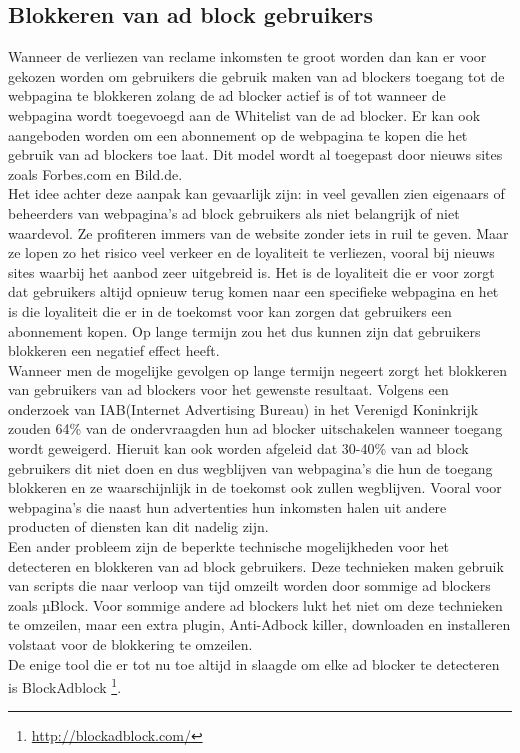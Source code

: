 \documentclass[pdftex,a4paper,12pt,twoside]{report}
\begin{document}
\subsection{Blokkeren van ad block gebruikers}
\label{sec Blokkeren van ad block gebruikers}
Wanneer de verliezen van reclame inkomsten te groot worden dan kan er voor gekozen worden om gebruikers die gebruik maken van ad blockers toegang tot de webpagina te blokkeren zolang de ad blocker actief is of tot wanneer de webpagina wordt toegevoegd aan de \gls{Whitelist} van de ad blocker. Er kan ook aangeboden worden om een abonnement op de webpagina te kopen die het gebruik van ad blockers toe laat. Dit model wordt al toegepast door nieuws sites zoals Forbes.com en Bild.de.
\\
Het idee achter deze aanpak kan gevaarlijk zijn: in veel gevallen zien eigenaars of beheerders van webpagina's ad block gebruikers als niet belangrijk of niet waardevol. Ze profiteren immers van de website zonder iets in ruil te geven. Maar ze lopen zo het risico veel verkeer en de loyaliteit te verliezen, vooral bij nieuws sites waarbij het aanbod zeer uitgebreid is. Het is de loyaliteit die er voor zorgt dat gebruikers altijd opnieuw terug komen naar een specifieke webpagina en het is die loyaliteit die er in de toekomst voor kan zorgen dat gebruikers een abonnement kopen. Op lange termijn zou het dus kunnen zijn dat gebruikers blokkeren een negatief effect heeft.
\\
Wanneer men de mogelijke gevolgen op lange termijn negeert zorgt het blokkeren van gebruikers van ad blockers voor het gewenste resultaat. Volgens een onderzoek van IAB(Internet Advertising Bureau) in het Verenigd Koninkrijk zouden 64\% van de ondervraagden hun ad blocker uitschakelen wanneer toegang wordt geweigerd. Hieruit kan ook worden afgeleid dat 30-40\% van ad block gebruikers dit niet doen en dus wegblijven van webpagina's die hun de toegang blokkeren en ze waarschijnlijk in de toekomst ook zullen wegblijven. Vooral voor webpagina's die naast hun advertenties hun inkomsten halen uit andere producten of diensten kan dit nadelig zijn.
\\
Een ander probleem zijn de beperkte technische mogelijkheden voor het detecteren en blokkeren van ad block gebruikers. Deze technieken maken gebruik van scripts die naar verloop van tijd omzeilt worden door sommige ad blockers zoals µBlock. Voor sommige andere ad blockers lukt het niet om deze technieken te omzeilen, maar een extra plugin, Anti-Adbock killer, downloaden en installeren volstaat voor de blokkering te omzeilen.
\\
De enige tool die er tot nu toe altijd in slaagde om elke ad blocker te detecteren is BlockAdblock \footnote{\url{http://blockadblock.com/}}.
\end{document}

